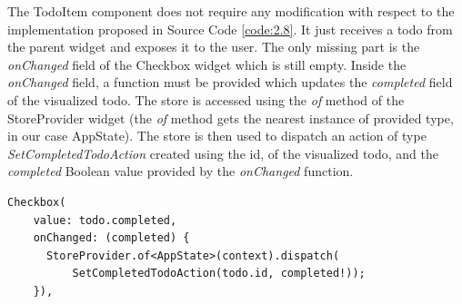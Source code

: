 The TodoItem component does not require any modification with respect to the implementation proposed in Source Code \ref{code:2.8}. It just receives a todo from the parent widget and exposes it to the user. The only missing part is the \textit{onChanged} field of the Checkbox widget which is still empty. Inside the \textit{onChanged} field, a function must be provided which updates the \textit{completed} field of the visualized todo. The store is accessed using the \textit{of} method of the StoreProvider widget (the \textit{of} method gets the nearest instance of provided type, in our case AppState). The store is then used to dispatch an action of type \textit{SetCompletedTodoAction} created using the id, of the visualized todo, and the \textit{completed} Boolean value provided by the \textit{onChanged} function.

\begin{code}
\mbox{}
 \mbox{}
		\label{code:2.14}
\begin{verbatim}
Checkbox(
    value: todo.completed,
    onChanged: (completed) {
      StoreProvider.of<AppState>(context).dispatch(
          SetCompletedTodoAction(todo.id, completed!));
    }),
\end{verbatim}
\mbox{}
\end{code}

